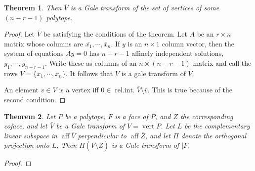 \documentclass[a4paper,10pt,landscape]{article}
\newtheorem{theorem}{Theorem}[section]
\def\aff{\operatorname{aff}}
\def\verti{\operatorname{vert}}
\def\relint{\operatorname{rel. int.}}
\begin{document}
\begin{multicols}{3}
\begin{theorem}
    Then $\bar{V}$ is a Gale transform of the set of vertices of some $(n- r -
    1)$ polytope.
  \end{theorem}
  \begin{proof}
    Let $\bar{V}$ be satisfying the conditions of the theorem. Let $A$ be an $r
    \times n$ matrix whose columns are $\bar{x_1}, \cdots, \bar{x}_n$. If $y$ is
    an $n \times 1$ column vector, then the system of equations $A y = 0$ has $n
    - r - 1$ affinely independent solutions, $y_1, \cdots, y_{n-r-1}$. Write
    these as columns of an $n \times (n - r - 1)$ matrix and call the rows $V =
    \{x_1, \cdots, x_n\}$. It follows that $V$ is a gale transform of $\bar{V}$.

    An element $v\in V$ is a vertex iff $0 \in \relint \bar{V} \setminus
    \bar{v}$. This is true because of the second condition.
  \end{proof}

  \begin{theorem}
    Let $P$ be a polytope, $F$ is a face of $P$, and $Z$ the corresponding
    coface, and let $\bar{V}$ be a Gale transform of $V = \verti P$. Let $L$ be
    the complementary linear subspace in $\aff \bar{V}$ perpendicular to $\aff
    \bar{Z}$, and let $\Pi$ denote the orthogonal projection onto $L$. Then
    $\Pi(\bar{V} \setminus \bar{Z})$ is a Gale transform of $\vert F$.
  \end{theorem}
  \begin{proof}

  \end{proof}
      
\end{multicols}
\end{document}
